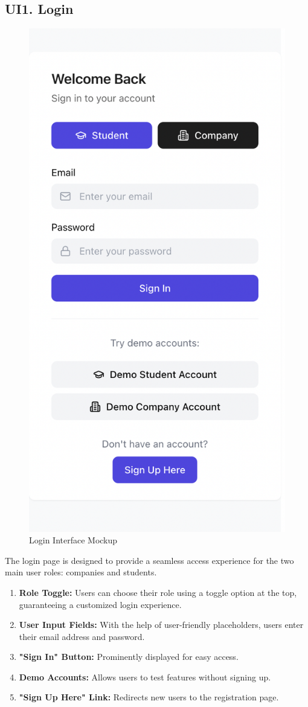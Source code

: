 \subsection{UI1. Login}
\label{subsec:login_ui}%
\begin{figure}[H]
    \begin{center}
        \includegraphics[width=0.52\linewidth]{JhaBhatiaSharma/imagesDD/LoginMockup.png}
        \caption{Login Interface Mockup}
        \label{fig:LoginInterface}
    \end{center}
\end{figure}
The login page is designed to provide a seamless access experience for the two main user roles: companies and students. 

\begin{enumerate}
    \item \textbf{Role Toggle:} Users can choose their role using a toggle option at the top, guaranteeing a customized login experience.
    \item \textbf{User Input Fields:} With the help of user-friendly placeholders, users enter their email address and password.
    \item \textbf{"Sign In" Button:} Prominently displayed for easy access.
    \item \textbf{Demo Accounts:} Allows users to test features without signing up.
    \item \textbf{"Sign Up Here" Link:} Redirects new users to the registration page.
\end{enumerate}

